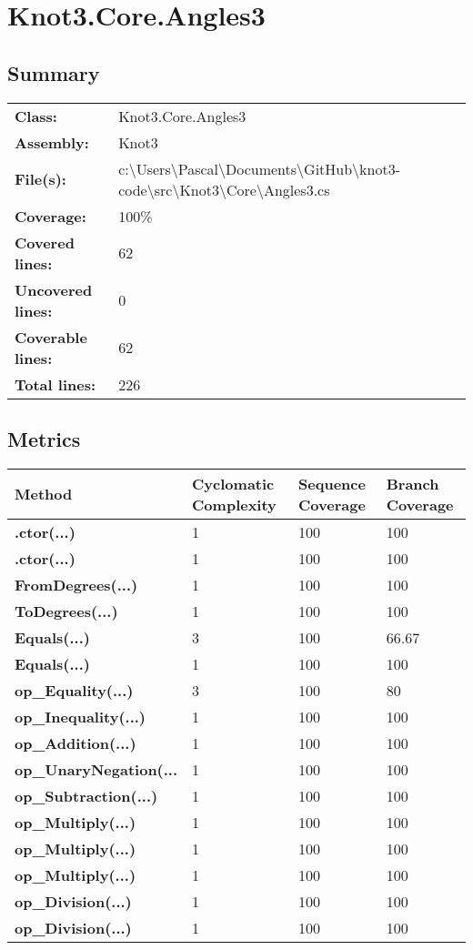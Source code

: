 \documentclass[a4paper,10pt]{article}
\begin{document}
\section{Knot3.Core.Angles3}
\subsection{Summary}
\begin{longtable}[l]{ll}
\textbf{Class:} & Knot3.Core.Angles3\\
\textbf{Assembly:} & Knot3\\
\textbf{File(s):} & \begin{minipage}[t]{12cm}{c:\textbackslash Users\textbackslash Pascal\textbackslash Documents\textbackslash GitHub\textbackslash knot3-code\textbackslash src\textbackslash Knot3\textbackslash Core\textbackslash Angles3.cs}\end{minipage} \\
\textbf{Coverage:} & 100\%\\
\textbf{Covered lines:} & 62\\
\textbf{Uncovered lines:} & 0\\
\textbf{Coverable lines:} & 62\\
\textbf{Total lines:} & 226\\
\end{longtable}
\subsection{Metrics}
\begin{longtable}[l]{|l|l|l|l|}
\hline
\textbf{Method} & \textbf{Cyclomatic Complexity} & \textbf{Sequence Coverage} & \textbf{Branch Coverage}\\
\hline
\textbf{.ctor(...)} & 1 & 100 & 100\\
\hline
\textbf{.ctor(...)} & 1 & 100 & 100\\
\hline
\textbf{FromDegrees(...)} & 1 & 100 & 100\\
\hline
\textbf{ToDegrees(...)} & 1 & 100 & 100\\
\hline
\textbf{Equals(...)} & 3 & 100 & 66.67\\
\hline
\textbf{Equals(...)} & 1 & 100 & 100\\
\hline
\textbf{op\_Equality(...)} & 3 & 100 & 80\\
\hline
\textbf{op\_Inequality(...)} & 1 & 100 & 100\\
\hline
\textbf{op\_Addition(...)} & 1 & 100 & 100\\
\hline
\textbf{op\_UnaryNegation(...} & 1 & 100 & 100\\
\hline
\textbf{op\_Subtraction(...)} & 1 & 100 & 100\\
\hline
\textbf{op\_Multiply(...)} & 1 & 100 & 100\\
\hline
\textbf{op\_Multiply(...)} & 1 & 100 & 100\\
\hline
\textbf{op\_Multiply(...)} & 1 & 100 & 100\\
\hline
\textbf{op\_Division(...)} & 1 & 100 & 100\\
\hline
\textbf{op\_Division(...)} & 1 & 100 & 100\\
\hline
\end{longtable}
\end{document}
